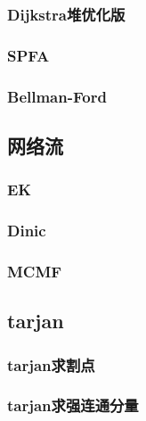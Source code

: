 \documentclass[10pt,a4paper]{article}
\begin{document}
\subsubsection{Dijkstra堆优化版}
\begin{spacing}{1.5}

\end{spacing}

\subsubsection{SPFA}
\begin{spacing}{1.5}

\end{spacing}

\subsubsection{Bellman-Ford}

\subsection{网络流}
\subsubsection{EK}

\subsubsection{Dinic}

\subsubsection{MCMF}

\subsection{tarjan}
\subsubsection{tarjan求割点}
\begin{spacing}{1.5}

\end{spacing}

\subsubsection{tarjan求强连通分量}
\begin{spacing}{1.5}

\end{spacing}

\end{document}
